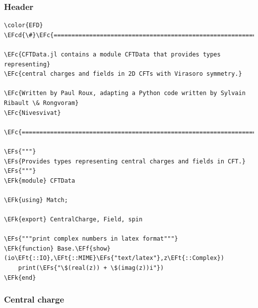 \documentclass[a4paper]{article}
\numberwithin{equation}{section}
\newcommand{\EFc}[1]{\textcolor{EFc}{#1}} %
\newcommand{\EFcd}[1]{\textcolor{EFcd}{#1}} %
\newcommand{\EFs}[1]{\textcolor{EFs}{#1}} %
\newcommand{\EFk}[1]{\textcolor{EFk}{#1}} %
\newcommand{\EFf}[1]{\textcolor{EFf}{#1}} %
\newcommand{\EFt}[1]{\textcolor{EFt}{#1}} %
\begin{document}
\subsubsection*{Header}
\label{sec:org6e4771e}

\begin{Code}
\begin{Verbatim}
\color{EFD}
\EFcd{\#}\EFc{===========================================================================================}

\EFc{CFTData.jl contains a module CFTData that provides types representing}
\EFc{central charges and fields in 2D CFTs with Virasoro symmetry.}

\EFc{Written by Paul Roux, adapting a Python code written by Sylvain Ribault \& Rongvoram}
\EFc{Nivesvivat}

\EFc{============================================================================================\#}

\EFs{"""}
\EFs{Provides types representing central charges and fields in CFT.}
\EFs{"""}
\EFk{module} CFTData

\EFk{using} Match;

\EFk{export} CentralCharge, Field, spin

\EFs{"""print complex numbers in latex format"""}
\EFk{function} Base.\EFf{show}(io\EFt{::IO},\EFt{::MIME}\EFs{"text/latex"},z\EFt{::Complex})
    print(\EFs{"\$(real(z)) + \$(imag(z))i"})
\EFk{end}

\end{Verbatim}
\end{Code}
\subsubsection*{Central charge}
\label{sec:org23e754e}
\end{document}
